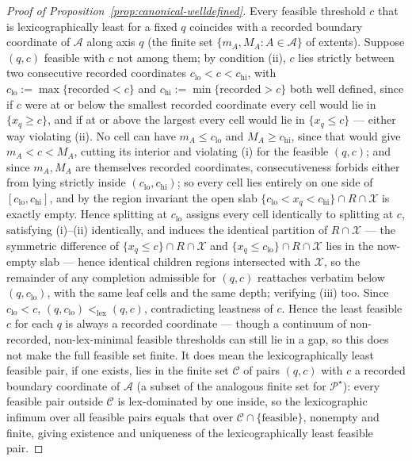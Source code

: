 \documentclass[11pt]{article}
\theoremstyle{plain}
\theoremstyle{definition}
\theoremstyle{remark}
\newcommand{\cX}{\mathcal{X}}
\newcommand{\cA}{\mathcal{A}}
\newcommand{\cC}{\mathcal{C}}
\newcommand{\cP}{\mathcal{P}}
\begin{document}
\begin{proof}[Proof of Proposition~\ref{prop:canonical-welldefined}]
Every feasible threshold \(c\) that is lexicographically least for a fixed
\(q\) coincides with a recorded boundary coordinate of \(\cA\) along axis
\(q\) (the finite set \(\{m_A,M_A:A\in\cA\}\) of extents). Suppose \((q,c)\)
feasible with \(c\) not among them; by condition (ii), \(c\) lies strictly
between two consecutive recorded coordinates
\(c_{\mathrm{lo}}<c<c_{\mathrm{hi}}\), with
\(c_{\mathrm{lo}}:=\max\{\text{recorded}<c\}\) and
\(c_{\mathrm{hi}}:=\min\{\text{recorded}>c\}\) both well defined, since if
\(c\) were at or below the smallest recorded coordinate every cell would
lie in \(\{x_q\ge c\}\), and if at or above the largest every cell would lie
in \(\{x_q\le c\}\) --- either way violating (ii). No cell can have
\(m_A\le c_{\mathrm{lo}}\) and \(M_A\ge c_{\mathrm{hi}}\), since that would
give \(m_A<c<M_A\), cutting its interior and violating (i) for the feasible
\((q,c)\); and since \(m_A,M_A\) are themselves recorded coordinates,
consecutiveness forbids either from lying strictly inside
\((c_{\mathrm{lo}},c_{\mathrm{hi}})\); so every cell lies entirely on one
side of
\([c_{\mathrm{lo}},c_{\mathrm{hi}}]\), and by the region invariant the open
slab \(\{c_{\mathrm{lo}}<x_q<c_{\mathrm{hi}}\}\cap R\cap\cX\) is exactly
empty. Hence splitting at \(c_{\mathrm{lo}}\) assigns every cell identically
to splitting at \(c\), satisfying (i)--(ii) identically, and induces the
identical partition of \(R\cap\cX\) --- the symmetric difference of
\(\{x_q\le c\}\cap R\cap\cX\) and \(\{x_q\le c_{\mathrm{lo}}\}\cap R\cap\cX\)
lies in the now-empty slab --- hence identical children regions
intersected with \(\cX\), so the remainder of any completion admissible for
\((q,c)\) reattaches verbatim below \((q,c_{\mathrm{lo}})\), with the same
leaf cells and the same depth; verifying (iii) too.
Since \(c_{\mathrm{lo}}<c\), \((q,c_{\mathrm{lo}})<_{\mathrm{lex}}(q,c)\),
contradicting leastness of \(c\). Hence the least feasible \(c\) for each
\(q\) is always a recorded coordinate --- though a continuum of
non-recorded, non-lex-minimal feasible thresholds can still lie in a gap,
so this does not make the full feasible set finite. It does mean the
lexicographically least feasible pair, if one exists, lies in the finite
set \(\cC\) of pairs \((q,c)\) with \(c\) a recorded boundary coordinate of
\(\cA\) (a subset of the analogous finite set for \(\cP^\star\)): every
feasible pair outside \(\cC\) is lex-dominated by one inside, so the
lexicographic infimum over all feasible pairs equals that over
\(\cC\cap\{\text{feasible}\}\), nonempty and finite, giving existence and
uniqueness of the lexicographically least feasible pair.


\end{proof}
\end{document}
